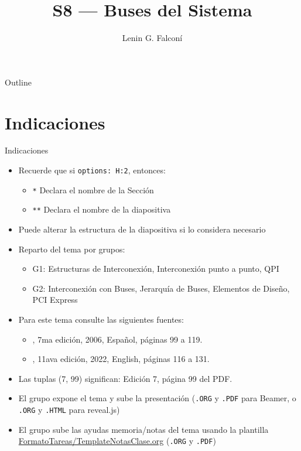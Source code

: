 \documentclass[presentation]{beamer}
\author{Lenin G. Falconí}
\date{}
\title{S8 — Buses del Sistema}
\begin{document}
\maketitle
\begin{frame}{Outline}
\tableofcontents
\end{frame}


\section{Indicaciones}
\label{sec:org15bc2f6}
\begin{frame}{Indicaciones}
 \begin{itemize}
\item Recuerde que si \texttt{options: H:2}, entonces:
\begin{itemize}
\item \texttt{*} Declara el nombre de la Sección
\item \texttt{**} Declara el nombre de la diapositiva
\end{itemize}
\item Puede alterar la estructura de la diapositiva si lo considera necesario
\item Reparto del tema por grupos:
\begin{itemize}
\item \alert{G1:} Estructuras de Interconexión, Interconexión punto a punto, QPI
\item \alert{G2:} Interconexión con Buses, Jerarquía de Buses, Elementos de Diseño, PCI Express
\end{itemize}
\item Para este tema consulte las siguientes fuentes:
\begin{itemize}
\item \textcite{stallings2006esp}, 7ma edición, 2006, Español, páginas 99 a 119.
\item \textcite{stallings2022computer}, 11ava edición, 2022, English, páginas 116 a 131.
\end{itemize}
\item Las tuplas (7, 99) significan: Edición 7, página 99 del PDF.
\item El grupo expone el tema y sube la presentación (\texttt{.ORG} y \texttt{.PDF} para Beamer, o \texttt{.ORG} y \texttt{.HTML} para reveal.js)
\item El grupo sube las ayudas memoria/notas del tema usando la plantilla \url{FormatoTareas/TemplateNotasClase.org} (\texttt{.ORG} y \texttt{.PDF})
\end{itemize}
\end{frame}
\end{document}

